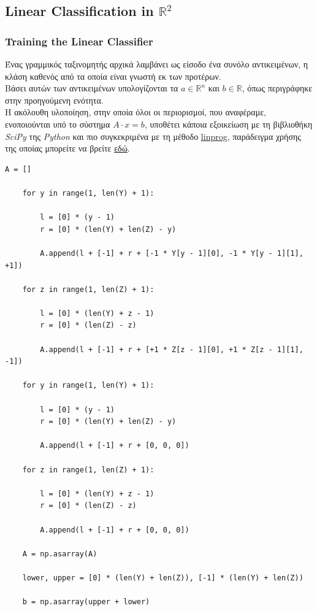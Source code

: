 \documentclass[12pt]{article}
\newcommand{\R}{\mathbb{R}}
\begin{document}
\subsection{Linear Classification in \( \R^2 \)}

\subsubsection{Training the Linear Classifier}

Ένας γραμμικός ταξινομητής αρχικά λαμβάνει ως είσοδο ένα συνόλο αντικειμένων,
η κλάση καθενός από τα οποία είναι γνωστή εκ των προτέρων. \\

Βάσει αυτών των αντικειμένων υπολογίζονται τα \( a \in \R^{n} \) και \( b \in \R \),
όπως περιγράφηκε στην προηγούμενη ενότητα. \\

Η ακόλουθη υλοποίηση, στην οποία όλοι οι περιορισμοί,
που αναφέραμε, ενοποιούνται υπό το σύστημα \( Α \cdot x = b \),
υποθέτει κάποια εξοικείωση με τη βιβλιοθήκη \textit{SciPy} της \textit{Python}
και πιο συγκεκριμένα με τη μέθοδο
\href{https://docs.scipy.org/doc/scipy/reference/optimize.linprog-simplex.html}{linprog},
παράδειγμα χρήσης της οποίας μπορείτε να βρείτε
\href{https://stackoverflow.com/questions/45873783/python-linprog-minimization-simplex-method}{εδώ}. \\

\pagebreak

\begin{lstlisting}[caption={Calculating matrix \textbf{A} and vector \textbf{b}}]
    A = []

    for y in range(1, len(Y) + 1):

        l = [0] * (y - 1)
        r = [0] * (len(Y) + len(Z) - y)

        A.append(l + [-1] + r + [-1 * Y[y - 1][0], -1 * Y[y - 1][1], +1])

    for z in range(1, len(Z) + 1):

        l = [0] * (len(Y) + z - 1)
        r = [0] * (len(Z) - z)

        A.append(l + [-1] + r + [+1 * Z[z - 1][0], +1 * Z[z - 1][1], -1])

    for y in range(1, len(Y) + 1):

        l = [0] * (y - 1)
        r = [0] * (len(Y) + len(Z) - y)

        A.append(l + [-1] + r + [0, 0, 0])

    for z in range(1, len(Z) + 1):

        l = [0] * (len(Y) + z - 1)
        r = [0] * (len(Z) - z)

        A.append(l + [-1] + r + [0, 0, 0])

    A = np.asarray(A)

    lower, upper = [0] * (len(Y) + len(Z)), [-1] * (len(Y) + len(Z))

    b = np.asarray(upper + lower)
\end{lstlisting}
\end{document}
